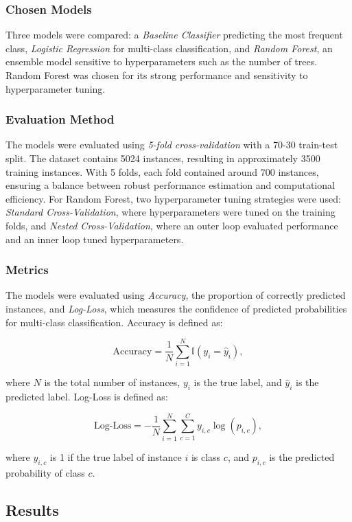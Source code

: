 \documentclass[fleqn,moreauthors,10pt]{ds_report}
\begin{document}
\subsubsection*{Chosen Models}
Three models were compared: a \textit{Baseline Classifier} predicting the most frequent class, \textit{Logistic Regression} for multi-class classification, and \textit{Random Forest}, an ensemble model sensitive to hyperparameters such as the number of trees. Random Forest was chosen for its strong performance and sensitivity to hyperparameter tuning.

\subsubsection*{Evaluation Method}
The models were evaluated using \textit{5-fold cross-validation} with a 70-30 train-test split. The dataset contains 5024 instances, resulting in approximately 3500 training instances. With 5 folds, each fold contained around 700 instances, ensuring a balance between robust performance estimation and computational efficiency. For Random Forest, two hyperparameter tuning strategies were used: \textit{Standard Cross-Validation}, where hyperparameters were tuned on the training folds, and \textit{Nested Cross-Validation}, where an outer loop evaluated performance and an inner loop tuned hyperparameters.

\subsubsection*{Metrics}
The models were evaluated using \textit{Accuracy}, the proportion of correctly predicted instances, and \textit{Log-Loss}, which measures the confidence of predicted probabilities for multi-class classification. Accuracy is defined as:

\[
\text{Accuracy} = \frac{1}{N} \sum_{i=1}^N \mathbb{I}(y_i = \hat{y}_i),
\]

where \( N \) is the total number of instances, \( y_i \) is the true label, and \( \hat{y}_i \) is the predicted label. Log-Loss is defined as:

\[
\text{Log-Loss} = -\frac{1}{N} \sum_{i=1}^N \sum_{c=1}^C y_{i,c} \log(p_{i,c}),
\]

where \( y_{i,c} \) is 1 if the true label of instance \( i \) is class \( c \), and \( p_{i,c} \) is the predicted probability of class \( c \).


\subsection*{Results}
\end{document}
